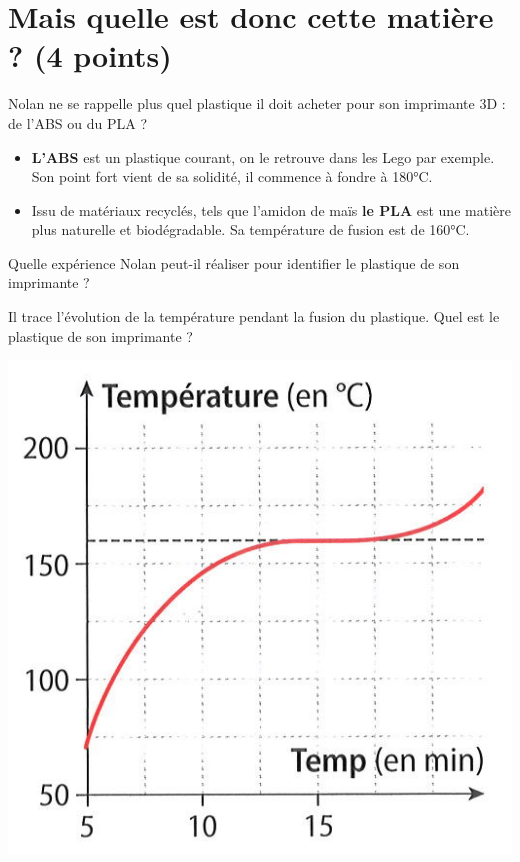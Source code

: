 \section{Mais quelle est donc cette matière ? (4 points)}

Nolan ne se rappelle plus quel plastique il doit acheter pour son imprimante 3D : de l'ABS ou du PLA ?

\begin{itemize}
	\item \textbf{L'ABS} est un plastique courant, on le retrouve dans les Lego par exemple. Son point fort vient de sa solidité, il commence à fondre à 180°C.
	
	\item Issu de matériaux recyclés, tels que l'amidon de maïs \textbf{le PLA} est une matière plus naturelle et biodégradable. Sa température de fusion est de 160°C.	
\end{itemize}

\begin{questions}
	\question[2] Quelle expérience Nolan peut-il réaliser pour identifier le plastique de son imprimante ?
	
	\question[2] Il trace l'évolution de la température pendant la fusion du plastique. Quel est le plastique de son imprimante ?
	
	\begin{center}
		\includegraphics[scale=0.6]{img/courbe2}
	\end{center}
\end{questions}